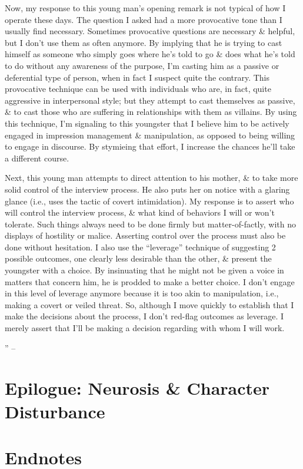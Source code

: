 \documentclass{article}
\numberwithin{equation}{section}
\begin{document}
Now, my response to this young man's opening remark is not typical of how I operate these days. The question I asked had a more provocative tone than I usually find necessary. Sometimes provocative questions are necessary \& helpful, but I don't use them as often anymore. By implying that he is trying to cast himself as someone who simply goes where he's told to go \& does what he's told to do without any awareness of the purpose, I'm casting him as a passive or deferential type of person, when in fact I suspect quite the contrary. This provocative technique can be used with individuals who are, in fact, quite aggressive in interpersonal style; but they attempt to cast themselves as passive, \& to cast those who are suffering in relationships with them as villains. By using this technique, I'm signaling to this youngster that I believe him to be actively engaged in impression management \& manipulation, as opposed to being willing to engage in discourse. By stymieing that effort, I increase the chances he'll take a different course.

Next, this young man attempts to direct attention to his mother, \& to take more solid control of the interview process. He also puts her on notice with a glaring glance (i.e., uses the tactic of covert intimidation). My response is to assert who will control the interview process, \& what kind of behaviors I will or won't tolerate. Such things always need to be done firmly but matter-of-factly, with no displays of hostility or malice. Asserting control over the process must also be done without hesitation. I also use the ``leverage'' technique of suggesting 2 possible outcomes, one clearly less desirable than the other, \& present the youngster with a choice. By insinuating that he might not be given a voice in matters that concern him, he is prodded to make a better choice. I don't engage in this level of leverage anymore because it is too akin to manipulation, i.e., making a covert or veiled threat. So, although I move quickly to establish that I make the decisions about the process, I don't red-flag outcomes as leverage. I merely assert that I'll be making a decision regarding with whom I will work.

'' -- \cite[pp. 210--210]{Simon2011}


\section{Epilogue: Neurosis \& Character Disturbance}


\section*{Endnotes}


\printbibliography[heading=bibintoc]
	
\end{document}
